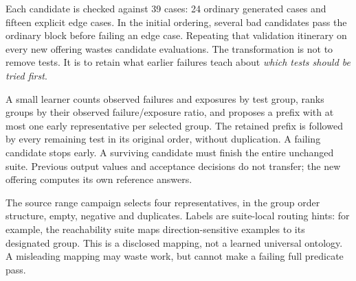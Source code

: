 \documentclass[11pt,letterpaper]{article}
\begin{document}
Each candidate is checked against 39 cases: 24 ordinary generated cases and fifteen explicit edge cases. In the initial ordering, several bad candidates pass the ordinary block before failing an edge case. Repeating that validation itinerary on every new offering wastes candidate evaluations. The transformation is not to remove tests. It is to retain what earlier failures teach about \emph{which tests should be tried first}.

A small learner counts observed failures and exposures by test group, ranks groups by their observed failure/exposure ratio, and proposes a prefix with at most one early representative per selected group. The retained prefix is followed by every remaining test in its original order, without duplication. A failing candidate stops early. A surviving candidate must finish the entire unchanged suite. Previous output values and acceptance decisions do not transfer; the new offering computes its own reference answers.

The source range campaign selects four representatives, in the group order structure, empty, negative and duplicates. Labels are suite-local routing hints: for example, the reachability suite maps direction-sensitive examples to its designated group. This is a disclosed mapping, not a learned universal ontology. A misleading mapping may waste work, but cannot make a failing full predicate pass.
\end{document}
